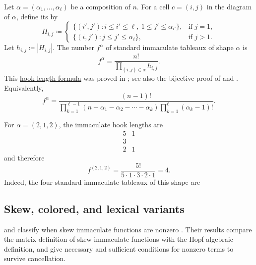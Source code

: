 \begin{theorem}
Let $\alpha=(\alpha_1,\dotsc,\alpha_\ell)$ be a composition of $n$.
For a cell $c=(i,j)$ in the diagram of $\alpha$, define its
\label{immaculateHook} by
\[
  H_{i,j} \coloneqq
  \begin{cases}
    \{(i',j') : i \leq i' \leq \ell,\ 1 \leq j' \leq \alpha_{i'}\},
      & \text{if } j=1,\\
    \{(i,j') : j \leq j' \leq \alpha_i\},
      & \text{if } j>1.
  \end{cases}
\]
Let $h_{i,j}\coloneqq |H_{i,j}|$.  The number $f^\alpha$ of standard
immaculate tableaux of shape $\alpha$ is
\[
  f^\alpha = \frac{n!}{\prod_{(i,j)\in\alpha} h_{i,j}}.
\]
This \hyperref[hookLength]{hook-length formula} was proved in
\cite[Prop.~3.13]{BergBergeronSaliolaSerranoZabrocki2014}; see also the
bijective proof of  and 
\cite[Thm.~1.1]{GaoYang2016}.
Equivalently,
\[
  f^\alpha = \frac{(n-1)!}{
    \prod_{k=1}^{\ell-1}(n-\alpha_1-\alpha_2-\dotsb-\alpha_k)
    \prod_{k=1}^{\ell}(\alpha_k-1)!
  }.
\]
\end{theorem}

\begin{example*}
For $\alpha=(2,1,2)$, the immaculate hook lengths are
\[
  \begin{array}{cc}
    5 & 1\\
    3 & \\
    2 & 1
  \end{array}
\]
and therefore
\[
  f^{(2,1,2)} =
  \frac{5!}{5\cdot 1\cdot 3\cdot 2\cdot 1}=4.
\]
Indeed, the four standard immaculate tableaux of this shape are
\begin{figure}
\end{figure}
\end{example*}
\subsection[dualImmaculateVariants]{Skew, colored, and lexical variants}

 and  classify when skew immaculate
functions are nonzero \cite{MasonXie2026}.  Their results compare the matrix
definition of skew immaculate functions with the Hopf-algebraic definition, and
give necessary and sufficient conditions for nonzero terms to survive
cancellation.

